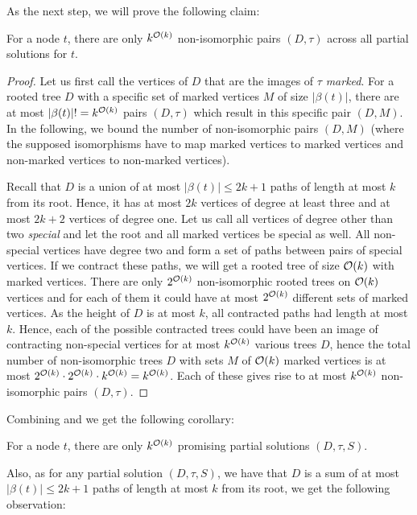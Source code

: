 \documentclass[a4paper,11pt]{article}
\begin{document}
As the next step, we will prove the following claim:
%
\begin{lemma}\label{lem:trees-shapes}
For a node $t$, there are only $k^{{\mathcal{O}}(k)}$ non-isomorphic pairs $(D, \tau)$ across all partial solutions for $t$.
\end{lemma}
\begin{proof}
Let us first call the vertices of $D$ that are the images of $\tau$ \emph{marked}. For a rooted tree $D$ with a specific set of marked vertices $M$ of size $|\beta(t)|$, there are at most $|\beta(t)|! = k^{{\mathcal{O}}(k)}$ pairs $(D, \tau)$ which result in this specific pair $(D, M)$. In the following, we bound the number of non-isomorphic pairs $(D, M)$ (where the supposed isomorphisms have to map marked vertices to marked vertices and non-marked vertices to non-marked vertices).

Recall that $D$ is a union of at most $|\beta(t)| \le 2k+1$ paths of length at most $k$ from its root. Hence, it has at most $2k$ vertices of degree at least three and at most $2k+2$ vertices of degree one. Let us call all vertices of degree other than two \emph{special} and let the root and all marked vertices be special as well. All non-special vertices have degree two and form a set of paths between pairs of special vertices. If we contract these paths, we will get a rooted tree of size ${\mathcal{O}}(k)$ with marked vertices. There are only $2^{{\mathcal{O}}(k)}$ non-isomorphic rooted trees on ${\mathcal{O}}(k)$ vertices and for each of them it could have at most $2^{{\mathcal{O}}(k)}$ different sets of marked vertices. As the height of $D$ is at most $k$, all contracted paths had length at most $k$. Hence, each of the possible contracted trees could have been an image of contracting non-special vertices for at most $k^{{\mathcal{O}}(k)}$ various trees $D$, hence the total number of non-isomorphic trees $D$ with sets $M$ of ${\mathcal{O}}(k)$ marked vertices is at most $2^{{\mathcal{O}}(k)} \cdot 2^{{\mathcal{O}}(k)}\cdot k^{{\mathcal{O}}(k)} = k^{{\mathcal{O}}(k)}$. Each of these gives rise to at most $k^{{\mathcal{O}}(k)}$ non-isomorphic pairs $(D, \tau)$. 
\end{proof}

Combining  and  we get the following corollary:

\begin{corollary} \label{lem:all-promising}
For a node $t$, there are only $k^{{\mathcal{O}}(k)}$ promising partial solutions $(D, \tau, S)$.
\end{corollary}

Also, as for any partial solution $(D, \tau, S)$, we have that $D$ is a sum of at most $|\beta(t)| \le 2k+1$ paths of length at most $k$ from its root, we get the following observation:
\end{document}
